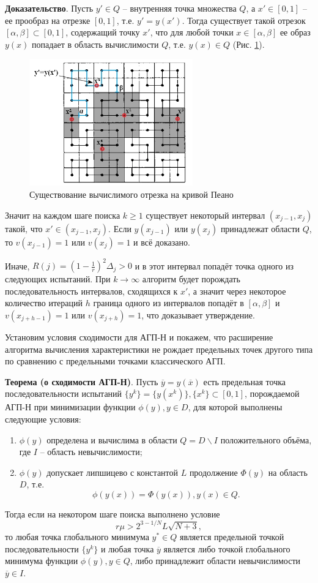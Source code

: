 \documentclass[10pt,a4paper]{book}
\begin{document}
\textbf{Доказательство}. Пусть $y' \in Q$ -- внутренняя точка множества $Q$, а $x' \in [0,1]$ -- ее прообраз на отрезке $[0,1]$, т.е. $y' = y(x')$. Тогда существует такой отрезок $[\alpha, \beta] \subset [0, 1]$, содержащий точку $x'$, что для любой точки $x \in [\alpha, \beta]$ ее образ $y(x)$ попадает в область вычислимости $Q$, т.е. $y(x) \in Q$ (Рис. \ref{fig_1}). 

\begin{figure}[h]
\includegraphics[width=200pt]{pic/fig_1.jpg}
\caption{Существование вычислимого отрезка на кривой Пеано} \label{fig_1}
\end{figure}

Значит на каждом шаге поиска $k \geq 1$ существует некоторый интервал $(x_{j-1}, x_{j})$ такой, что $x' \in (x_{j-1}, x_{j})$. Если $y(x_{j-1})$ или $y(x_{j})$ принадлежат области $Q$, то $v(x_{j-1}) = 1$ или $v(x_j) = 1$ и всё доказано.

Иначе, $R(j)=(1-\frac{1}{r})^2\Delta_j>0$ и в этот интервал попадёт точка одного из следующих испытаний. При $k \to \infty$ алгоритм будет порождать последовательность интервалов, сходящихся к $x'$, а значит через некоторое количество итераций $h$ граница одного из интервалов попадёт в $[\alpha, \beta]$ и $v(x_{j+h-1}) = 1$ или $v(x_{j+h}) = 1$, что доказывает утверждение.

Установим условия сходимости для АГП-Н и покажем, что расширение алгоритма вычисления характеристики не рождает предельных точек другого типа по сравнению с предельными точками классического АГП.

\textbf{Теорема (о сходимости АГП-Н)}. Пусть $\overline{y}=y(\overline{x})$ есть предельная точка последовательности испытаний $\{y^k\}=\{y(x^k)\}, \{x^k\} \subset [0,1]$, порождаемой АГП-Н при минимизации функции $\phi(y), y \in D$, для которой выполнены следующие условия:
\begin{enumerate}
\item{$\phi(y)$ определена и вычислима в области $Q = D \backslash I$ положительного объёма, где $I$ -- область невычислимости;}
\item{$\phi(y)$ допускает липшицево с константой $L$ продолжение $\Phi(y)$ на область $D$, т.е.
\[
\phi(y(x))=\Phi(y(x)), y(x) \in Q.
\]
}
\end{enumerate}
Тогда если на некотором шаге поиска выполнено условие
\[
r\mu > 2^{3-1/N}L\sqrt{N+3},
\]
то любая точка глобального минимума $y^* \in Q$ является предельной точкой последовательности $\{y^k\}$ и любая точка $\overline{y}$ является либо точкой глобального минимума функции $\phi(y), y \in Q$, либо принадлежит области невычислимости $\overline{y} \in I$.
\end{document}
